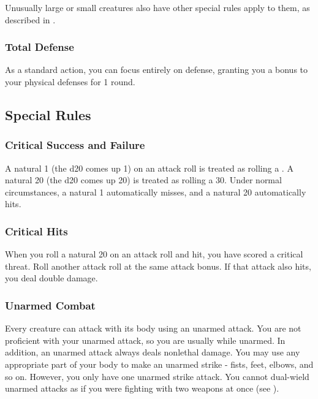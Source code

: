 Unusually large or small creatures also have other special rules apply to them, as described in .

\subsubsection{Total Defense}\label{Total Defense}
As a standard action, you can focus entirely on defense, granting you a  bonus to your physical defenses for 1 round.

\subsection{Special Rules}\label{Special Rules}

\subsubsection{Critical Success and Failure}\label{Critical Success and Failure}
A natural 1 (the d20 comes up 1) on an attack roll is treated as rolling a . A natural 20 (the d20 comes up 20) is treated as rolling a 30. Under normal circumstances, a natural 1 automatically misses, and a natural 20 automatically hits.

\subsubsection{Critical Hits}\label{Critical Hits}
When you roll a natural 20 on an attack roll and hit, you have scored a critical threat. Roll another attack roll at the same attack bonus. If that attack also hits, you deal double damage.


\subsubsection{Unarmed Combat}\label{Unarmed Combat}
Every creature can attack with its body using an unarmed attack. You are not proficient with your unarmed attack, so you are usually  while unarmed. In addition, an unarmed attack always deals nonlethal damage. You may use any appropriate part of your body to make an unarmed strike - fists, feet, elbows, and so on. However, you only have one unarmed strike attack. You cannot dual-wield unarmed attacks as if you were fighting with two weapons at once (see ).

